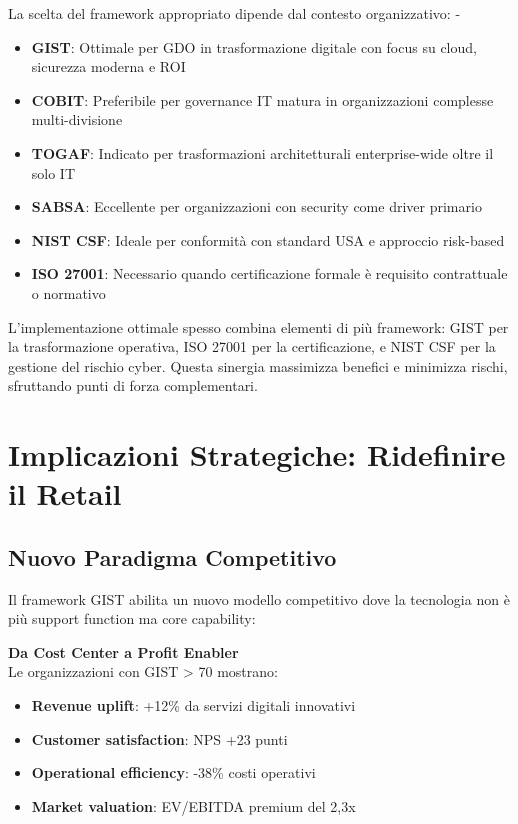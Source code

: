La scelta del framework appropriato dipende dal contesto organizzativo: - \begin{itemize}
    \item \textbf{GIST}: Ottimale per GDO in trasformazione digitale con focus
    su cloud, sicurezza moderna e ROI
    \item \textbf{COBIT}: Preferibile per governance IT matura in organizzazioni complesse multi-divisione
    \item \textbf{TOGAF}: Indicato per trasformazioni architetturali enterprise-wide oltre il solo IT
    \item \textbf{SABSA}: Eccellente per organizzazioni con security come driver primario
    \item \textbf{NIST CSF}: Ideale per conformità con standard USA e approccio risk-based 
    \item \textbf{ISO 27001}: Necessario quando certificazione formale è
    requisito contrattuale o normativo
\end{itemize}
L’implementazione ottimale spesso combina elementi di più framework: GIST per la trasformazione operativa, ISO 27001 per la certificazione, e NIST CSF per la gestione del rischio cyber. Questa sinergia massimizza benefici e minimizza rischi, sfruttando punti di forza complementari.

\section{\texorpdfstring{Implicazioni Strategiche: Ridefinire il Retail}{5.5 - Implicazioni Strategiche}}
\label{sec:5.5}

\subsection{\texorpdfstring{Nuovo Paradigma Competitivo}{5.5.1 - Nuovo Paradigma}}
\label{subsec:5.5.1}

Il framework GIST abilita un nuovo modello competitivo dove la tecnologia non è più support function ma core capability:

\textbf{Da Cost Center a Profit Enabler}\\
Le organizzazioni con GIST > 70 mostrano:
\begin{itemize}
\item \textbf{Revenue uplift}: +12\% da servizi digitali innovativi
\item \textbf{Customer satisfaction}: NPS +23 punti
\item \textbf{Operational efficiency}: -38\% costi operativi
\item \textbf{Market valuation}: EV/EBITDA premium del 2,3x
\end{itemize}


